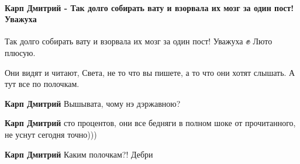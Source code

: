  
 
 
 
 
\paragraph{Карп Дмитрий - Так долго собирать вату и взорвала их мозг за один пост! Уважуха}
\label{sec:14_07_2021.fb.krjukova_svetlana.1.statja_putina_mnenie.cmt.karl_vata}

\begin{itemize}
 
Так долго собирать вату и взорвала их мозг за один пост! Уважуха ✊ Люто
плюсую.

Они видят и читают, Света, не то что вы пишете, а то что они хотят слышать. А
тут все по полочкам.

\begin{itemize}
 
\textbf{Карп Дмитрий} Вышывата, чому нэ дэржавною?

 
\textbf{Карп Дмитрий} сто процентов, они все бедняги в полном шоке от прочитанного, не уснут сегодня точно)))

 
\textbf{Карп Дмитрий}
Каким полочкам?! Дебри


\end{itemize}
\end{itemize}
